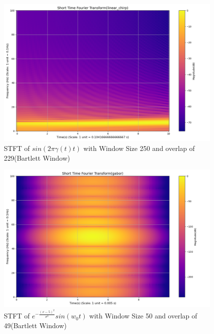 \documentclass[12pt,a4paper,onecolumn]{exam}
\begin{document}
\begin{solution}
\begin{itemize}
\begin{itemize}
        \begin{figure}[H]
        \centering
        \includegraphics[scale = 0.35]{linear_chirp_21_250.0.png}
        \caption{STFT of $sin(2\pi\gamma(t)t)$  with Window Size 250 and overlap of 229(Bartlett Window)}
        \label{fig:9}
        \end{figure}

      
        \begin{figure}[H]
        \centering
        \includegraphics[scale = 0.35]{gabor_1_50.0.png}
        \caption{STFT of $e^{-\frac{(x-5)^2}{\sigma^2}}sin(w_0t)$ with Window Size 50 and overlap of 49(Bartlett Window)}
        \label{fig:10}
        \end{figure}


\end{itemize}
\end{itemize}
\end{solution}
\end{document}
